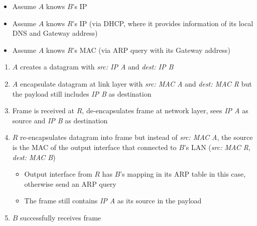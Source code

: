 \documentclass{article}
\begin{document}
\begin{itemize}
\begin{itemize}
\begin{itemize}
            \item Assume $A$ knows $B$'s IP
            \item Assume $A$ knows $R$'s IP (via DHCP, where it provides information of its local DNS
            and Gateway address)
            \item Assume $A$ knows $R$'s MAC (via ARP query with its Gateway address)
        \end{itemize}
        \begin{enumerate}
            \item $A$ creates a datagram with \textit{src: IP A} and \textit{dest: IP B}
            \item $A$ encapsulate datagram at link layer with \textit{src: MAC A} and \textit{dest: MAC R}
            but the payload still includes \textit{IP B} as destination
            \item Frame is received at $R$, de-encapsulates frame at network layer, sees 
            \textit{IP A} as source and \textit{IP B} as destination
            \item $R$ re-encapsulates datagram into frame but instead of \textit{src: MAC A}, the source
            is the MAC of the output interface that connected to $B$'s LAN (\textit{src: MAC R}, \textit{dest: MAC B})
            \begin{itemize}
                \item Output interface from $R$ has $B$'s mapping in its ARP table in this case, otherwise send an ARP query
                \item The frame still contains \textit{IP A} as its source in the payload
            \end{itemize}
            \item $B$ successfully receives frame
        \end{enumerate}
    \end{itemize}
\end{itemize}

\end{document}
